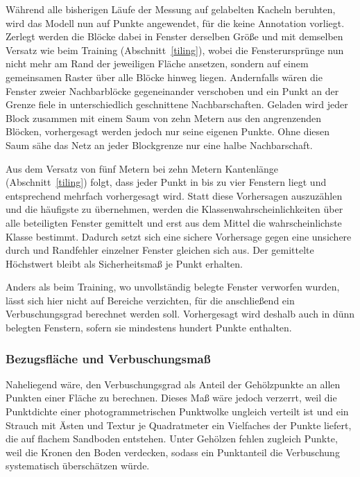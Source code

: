 Während alle bisherigen Läufe der Messung auf gelabelten Kacheln beruhten, wird das Modell nun auf Punkte angewendet, für die keine Annotation vorliegt. Zerlegt werden die Blöcke dabei in Fenster derselben Größe und mit demselben Versatz wie beim Training (Abschnitt~\ref{tiling}), wobei die Fensterursprünge nun nicht mehr am Rand der jeweiligen Fläche ansetzen, sondern auf einem gemeinsamen Raster über alle Blöcke hinweg liegen. Andernfalls wären die Fenster zweier Nachbarblöcke gegeneinander verschoben und ein Punkt an der Grenze fiele in unterschiedlich geschnittene Nachbarschaften. Geladen wird jeder Block zusammen mit einem Saum von zehn Metern aus den angrenzenden Blöcken, vorhergesagt werden jedoch nur seine eigenen Punkte. Ohne diesen Saum sähe das Netz an jeder Blockgrenze nur eine halbe Nachbarschaft.

Aus dem Versatz von fünf Metern bei zehn Metern Kantenlänge (Abschnitt~\ref{tiling}) folgt, dass jeder Punkt in bis zu vier Fenstern liegt und entsprechend mehrfach vorhergesagt wird. Statt diese Vorhersagen auszuzählen und die häufigste zu übernehmen, werden die Klassenwahrscheinlichkeiten über alle beteiligten Fenster gemittelt und erst aus dem Mittel die wahrscheinlichste Klasse bestimmt. Dadurch setzt sich eine sichere Vorhersage gegen eine unsichere durch und Randfehler einzelner Fenster gleichen sich aus. Der gemittelte Höchstwert bleibt als Sicherheitsmaß je Punkt erhalten.

Anders als beim Training, wo unvollständig belegte Fenster verworfen wurden, lässt sich hier nicht auf Bereiche verzichten, für die anschließend ein Verbuschungsgrad berechnet werden soll. Vorhergesagt wird deshalb auch in dünn belegten Fenstern, sofern sie mindestens hundert Punkte enthalten.

\subsubsection{Bezugsfläche und Verbuschungsmaß}\label{verbuschungsmass}

Naheliegend wäre, den Verbuschungsgrad als Anteil der Gehölzpunkte an allen Punkten einer Fläche zu berechnen. Dieses Maß wäre jedoch verzerrt, weil die Punktdichte einer photogrammetrischen Punktwolke ungleich verteilt ist und ein Strauch mit Ästen und Textur je Quadratmeter ein Vielfaches der Punkte liefert, die auf flachem Sandboden entstehen. Unter Gehölzen fehlen zugleich Punkte, weil die Kronen den Boden verdecken, sodass ein Punktanteil die Verbuschung systematisch überschätzen würde.

